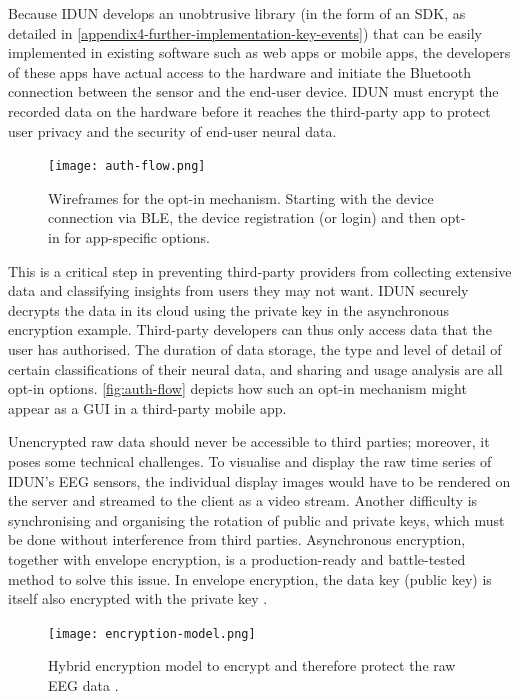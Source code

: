 Because IDUN develops an unobtrusive library (in the form of an SDK, as detailed in \autoref{appendix4-further-implementation-key-events}) that can be easily implemented in existing software such as web apps or mobile apps, the developers of these apps have actual access to the hardware and initiate the Bluetooth connection between the sensor and the end-user device. IDUN must encrypt the recorded data on the hardware before it reaches the third-party app to protect user privacy and the security of end-user neural data.

\begin{figure}[!ht]
  \centering
  \texttt{[image: auth-flow.png]}
  \caption{Wireframes for the opt-in mechanism. Starting with the device connection via BLE, the device registration (or login) and then opt-in for app-specific options.}
  \label{fig:auth-flow}
\end{figure}

This is a critical step in preventing third-party providers from collecting extensive data and classifying insights from users they may not want. IDUN securely decrypts the data in its cloud using the private key in the asynchronous encryption example. Third-party developers can thus only access data that the user has authorised. The duration of data storage, the type and level of detail of certain classifications of their neural data, and sharing and usage analysis are all opt-in options. \autoref{fig:auth-flow} depicts how such an opt-in mechanism might appear as a GUI in a third-party mobile app.

Unencrypted raw data should never be accessible to third parties; moreover, it poses some technical challenges. To visualise and display the raw time series of IDUN’s EEG sensors, the individual display images would have to be rendered on the server and streamed to the client as a video stream. Another difficulty is synchronising and organising the rotation of public and private keys, which must be done without interference from third parties. Asynchronous encryption, together with envelope encryption, is a production-ready and battle-tested method to solve this issue. In envelope encryption, the data key (public key) is itself also encrypted with the private key \citep{google_cloud_envelope_nodate}.

\begin{figure}[!ht]
  \centering
  \texttt{[image: encryption-model.png]}
  \caption[Hybrid encryption model to encrypt and therefore protect the raw EEG data]{Hybrid encryption model to encrypt and therefore protect the raw EEG data \citep{idun_guardian_nodate}.}
  \label{fig:encryption-model}
\end{figure}

